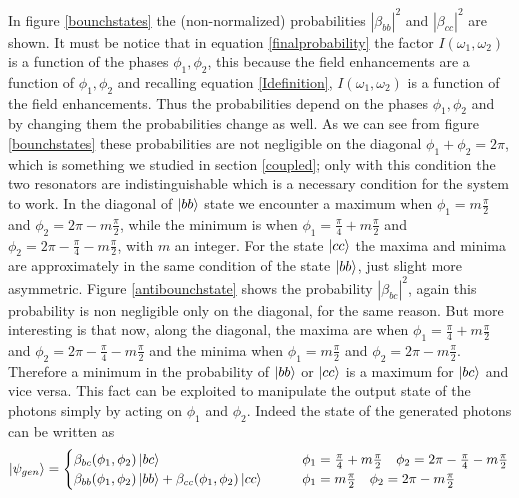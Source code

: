 In figure \ref{bounchstates} the (non-normalized) probabilities $|\beta_{bb}|^2$ and $|\beta_{cc}|^2$ are shown. It must be notice that in equation \eqref{finalprobability} the factor $I(\omega_1,\omega_2)$ is a function of the phases $\phi_1,\phi_2$, this because the field enhancements are a function of $\phi_1,\phi_2$ and recalling equation \eqref{Idefinition}, $I(\omega_1,\omega_2)$ is a function of the field enhancements. Thus the probabilities depend on the phases $\phi_1,\phi_2$ and by changing them the probabilities change as well. As we can see from figure \ref{bounchstates} these probabilities are not negligible on the diagonal $\phi_1 +\phi_2 = 2\pi$, which is something we studied in section \ref{coupled}; only with this condition the two resonators are indistinguishable which is a necessary condition for the system to work. In the diagonal of $\ket{bb}$ state we encounter a maximum when $\phi_1 = m\frac{\pi}{2}$ and $\phi_2 = 2\pi - m\frac{\pi}{2}$, while the minimum is when $\phi_1 = \frac{\pi}{4} + m\frac{\pi}{2}$ and $\phi_2 = 2\pi - \frac{\pi}{4} - m\frac{\pi}{2}$, with $m$ an integer. For the state $\ket{cc}$ the maxima and minima are approximately in the same condition of the state $\ket{bb}$, just slight more asymmetric. Figure \ref{antibounchstate} shows the probability $|\beta_{bc}|^2$, again this probability is non negligible only on the diagonal, for the same reason. But more interesting is that now, along the diagonal, the maxima are when $\phi_1 = \frac{\pi}{4} + m\frac{\pi}{2}$ and $\phi_2 = 2\pi - \frac{\pi}{4} - m\frac{\pi}{2}$ and the minima when $\phi_1 = m\frac{\pi}{2}$ and $\phi_2 = 2\pi - m\frac{\pi}{2}$. Therefore a minimum in the probability of $\ket{bb}$ or $\ket{cc}$ is a maximum for $\ket{bc}$ and vice versa. This fact can be exploited to manipulate the output state of the photons simply by acting on $\phi_1$ and $\phi_2$. Indeed the state of the generated photons can be written as
\begin{equation}\ket{\psi_{gen}} = \begin{cases}
\beta_{bc}(\phi_1,\phi_2)\ket{bc} &\qquad  \phi_1 =  \frac{\pi}{4} + m\frac{\pi}{2} \quad \phi_2 = 2\pi - \frac{\pi}{4} - m\frac{\pi}{2} \\
\beta_{bb}(\phi_1,\phi_2)\ket{bb} +\beta_{cc}(\phi_1,\phi_2)\ket{cc} &\qquad \phi_1 = m\frac{\pi}{2} \quad \phi_2 = 2\pi - m\frac{\pi}{2} \\
\end{cases}\end{equation}


